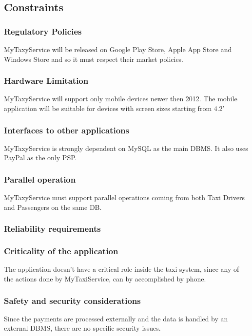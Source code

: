 \subsection{Constraints}
\subsubsection{Regulatory Policies}
MyTaxyService will be released on Google Play Store, Apple App Store and Windows Store and so it must respect their market policies. 
\subsubsection{Hardware Limitation}
MyTaxyService will support only mobile devices newer then 2012.
The mobile application will be suitable for devices with screen sizes starting from 4.2’
\subsubsection{Interfaces to other applications}
MyTaxyService is strongly dependent on MySQL as the main DBMS. It also uses PayPal as the only PSP. 
\subsubsection{Parallel operation}
MyTaxyService must support parallel operations coming from both Taxi Drivers and Passengers on the same DB.
\subsubsection{Reliability requirements}

\subsubsection{Criticality of the application}
The application doesn't have a critical role inside the taxi system, since any of the actions done by MyTaxiService, can by accomplished by phone.
\subsubsection{Safety and security considerations}
Since the payments are processed externally and the data is handled by an external DBMS, there are no specific security issues.

